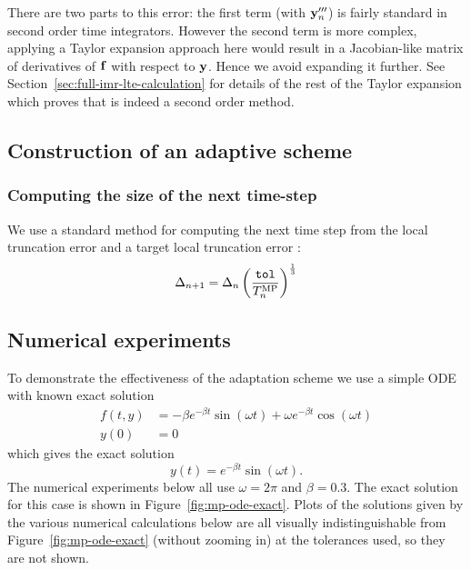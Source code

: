 There are two parts to this error: the first term (with $\mathbf{y}'''_n$) is fairly standard in second order time integrators.
However the second term is more complex, applying a Taylor expansion approach here would result in a Jacobian-like matrix of derivatives of ${\mathbf{f}}$ with respect to $\mathbf{y}$.
Hence we avoid expanding it further.
See Section~\ref{sec:full-imr-lte-calculation} for details of the rest of the Taylor expansion which proves that \imr is indeed a second order method.



\subsection{Construction of an adaptive scheme}



\subsubsection{Computing the size of the next time-step}

We use a standard method for computing the next time step from the local truncation error and a target local truncation error \toltt:\cite[pg.268]{Gresho-Sani}
\begin{equation}
\Delta_{n+1} = \Delta_{n} \left( \frac{{\textrm{\textup{\texttt{tol}}}}}{T_n^{\text{MP}}}  \right) ^{\frac{1}{3}}
\end{equation}


\subsection{Numerical experiments}

To demonstrate the effectiveness of the adaptation scheme we use a simple ODE with known exact solution
\begin{align}
  f(t,y) &= - \beta e^{-\beta t} \sin(\omega t) + \omega e^{-\beta t} \cos(\omega t) \\
  y(0) &= 0
\end{align}
which gives the exact solution
\begin{equation}
  \label{eq:59}
  y(t) = e^{-\beta t} \sin(\omega t).
\end{equation}
The numerical experiments below all use $\omega = 2 \pi$ and $\beta = 0.3$.
The exact solution for this case is shown in Figure~\ref{fig:mp-ode-exact}.
Plots of the solutions given by the various numerical calculations below are all visually indistinguishable from Figure~\ref{fig:mp-ode-exact} (without zooming in) at the tolerances used, so they are not shown.

